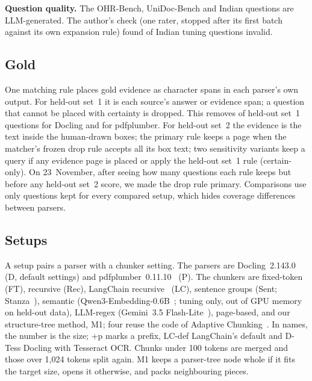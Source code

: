 \textbf{Question quality.} The OHR-Bench, UniDoc-Bench and Indian questions are LLM-generated. The author's check (one rater, stopped after its
first batch against its own expansion rule) found \GoldenOverallInvalid{} of
\GoldenOverallLabelled{} Indian tuning questions invalid.

\subsection{Gold}\label{sec:gold}

One matching rule places gold evidence as character spans in each parser's own
output. For held-out set~1 it is each source's answer or evidence span; a question that cannot be placed with certainty is dropped. This removes
\CoverageHeldOutDoclingShare{} of held-out set~1 questions for Docling and
\CoverageHeldOutPdfplumberShare{} for pdfplumber. For held-out set~2 the evidence
is the text inside the human-drawn boxes; the primary rule keeps a
page when the matcher's frozen drop rule accepts all its box text; two
sensitivity variants keep a query if any evidence page is placed  or
apply the held-out set~1 rule (certain-only). On 23~November, after seeing how many questions each rule keeps but before any
held-out set~2 score, we made the drop rule primary. Comparisons use only questions kept for every compared setup, which hides
coverage differences between parsers.

\subsection{Setups}\label{sec:setups}

A setup pairs a parser with a chunker setting. The parsers are
Docling~2.143.0~\cite{auer2024docling} (D, default settings) and
pdfplumber~0.11.10~\cite{pdfplumber} (P). The chunkers are fixed-token (FT),
recursive (Rec), LangChain recursive~\cite{langchain} (LC), sentence groups (Sent;
Stanza~\cite{stanza}), semantic (Qwen3-Embedding-0.6B~\cite{qwen3embedding};
tuning only, out of GPU memory on held-out data), LLM-regex
(Gemini~3.5 Flash-Lite~\cite{gemini}), page-based, and our structure-tree method, M1; four reuse the code of Adaptive
Chunking~\cite{demourajunior2026adaptive}. In names, the number is the size; +p marks a prefix,
LC-def LangChain's default and D-Tess Docling with Tesseract OCR. Chunks under 100 tokens are merged and those over 1,024 tokens split again. M1 keeps a parser-tree node whole if it fits the target
size, opens it otherwise, and packs neighbouring pieces.

